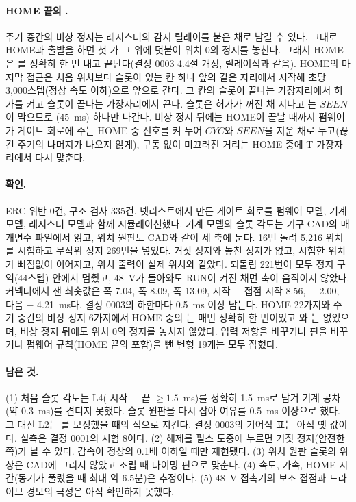\paragraph{HOME 끝의 .} 주기 중간의 비상 정지는 레지스터의 감지 릴레이를 붙은 채로 남길 수 있다. 그대로
HOME과 출발을 하면 첫 가 그 위에 덧붙어 위치 0의 정지를 놓친다. 그래서 HOME은 를 정확히
한 번 내고 끝난다(결정 0003 4.4절 개정, 릴레이식과 같음). HOME의 마지막 접근은 처음 위치보다 슬롯이 있는 칸 하나
앞의 같은 자리에서 시작해 초당 3,000스텝(정상 속도 이하)으로 앞으로 간다. 그 칸의  슬롯이 끝나는
가장자리에서 허가를 켜고  슬롯이 끝나는 가장자리에서 끈다.  슬롯은 허가가 꺼진 채 지나고
는 $\mathit{SEEN}$이 막으므로 (45~ms) 하나만 나간다. 비상 정지 뒤에는 HOME이 끝날 때까지
펌웨어가 게이트 회로에 주는 HOME 중 신호를 켜 두어 $\mathit{CYC}$와 $\mathit{SEEN}$을 지운 채로 두고(끊긴 주기의
나머지가 나오지 않게), 구동 없이 미끄러진 거리는 HOME 중에 T 가장자리에서
다시 맞춘다.

\paragraph{확인.} ERC 위반 0건, 구조 검사 335건. 넷리스트에서 만든 게이트 회로를 펌웨어 모델, 기계 모델, 레지스터
모델과 함께 시뮬레이션했다. 기계 모델의 슬롯 각도는 기구 CAD의 매개변수 파일에서 읽고, 위치 원판도 CAD와 같이 세 축에
둔다. 16번 돌려 5,216 위치를 시험하고 무작위 정지 269번을 넣었다. 거짓 정지와 놓친 정지가
없고, 시험한 위치가 빠짐없이 이어지고, 위치 출력이 실제 위치와 같았다. 되돌림 221번이 모두 정지 구역(44스텝) 안에서 멈췄고,
48~V가 돌아와도 RUN이 켜진 채면 축이 움직이지 않았다. 커넥터에서 잰 최솟값은  폭 7.04,  폭 8.09,
 폭 13.09,  시작 $-$  접점 시작 8.56, $-$ 2.00, 다음 $-$
4.21~ms다. 결정 0003의 하한마다 0.5~ms 이상 남는다. HOME 22가지와 주기 중간의 비상 정지 6가지에서 HOME 중의
는 매번 정확히 한 번이었고 와 는 없었으며, 비상 정지 뒤에도 위치 0의 정지를
놓치지 않았다. 입력 저항을 바꾸거나 핀을 바꾸거나 펌웨어 규칙(HOME 끝의  포함)을 뺀 변형 19개는 모두 잡혔다.

\paragraph{남은 것.} (1) 처음 슬롯 각도는 L4( 시작 $-$  끝 $\ge 1.5$~ms)를 정확히 1.5~ms로 남겨
기계 공차(약 0.3~ms)를 견디지 못했다. 슬롯 원판을 다시 잡아 여유를 0.5~ms 이상으로 했다. 그 대신 L2는 를
보정했을 때의 식으로 지킨다. 결정 0003의 기어식 표는 아직 옛 값이다. 실측은 결정 0001의 시험 8이다.
(2) 해제를  펄스 도중에 누르면 거짓 정지(안전한 쪽)가 날 수 있다. 감속이 정상의 0.1배 이하일 때만
재현됐다. (3) 위치 원판 슬롯의 위상은 CAD에 그리지 않았고 조립 때 타이밍 핀으로 맞춘다.
(4) 속도, 가속, HOME 시간(동기가 풀렸을 때 최대 약 6.5분)은 추정이다. (5) 48~V 접촉기의 보조 접점과 드라이브 경보의
극성은 아직 확인하지 못했다.

